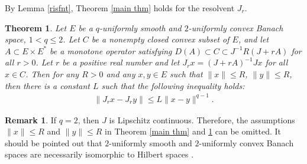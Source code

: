 \documentclass[12pt,a4paper]{amsart}
\newtheorem{theorem}{Theorem}[section]
\theoremstyle{definition}
\newtheorem{remark}{Remark}[section]
\numberwithin{equation}{section}
\begin{document}
By Lemma \ref{risfnt}, Theorem \ref{main thm} holds for the resolvent \( J_{r}\).

\begin{theorem}\label{main thm2}
Let \( E \) be a $q$-uniformly smooth and $2$-uniformly convex Banach space, $1< q \leq 2$. Let \( C \) be a nonempty closed convex subset of \( E \), and let \( A \subset E \times E^* \) be a monotone operator satisfying $D(A) \subset C \subset J^{-1}R(J + rA)$ for all \( r > 0 \). Let \( r \) be a positive real number and let \( J_r x = (J + rA)^{-1} Jx \) for all \( x \in C \). Then for any \( R > 0 \) and any \( x, y \in E \) such that \( \|x\| \leq R\), \( \|y\| \leq R\), then there is a constant $L$ such that the following inequality holds:
  \begin{align*}
    \|J_{r}x - J_{r}y\| \leq L \|x-y\|^{q-1}.
  \end{align*}
\end{theorem}

\begin{remark}
  If $q =2$, then $J$ is Lipschitz continuous. Therefore, the assumptions  $\|x\| \leq R$ and $\|y\| \leq R$ in Theorem \ref{main thm} and \ref{main thm2} can be omitted. It should be pointed out that $2$-uniformly smooth and $2$-uniformly convex Banach spaces are necessarily isomorphic to Hilbert spaces \cite{BB}.
\end{remark}





\end{document}
